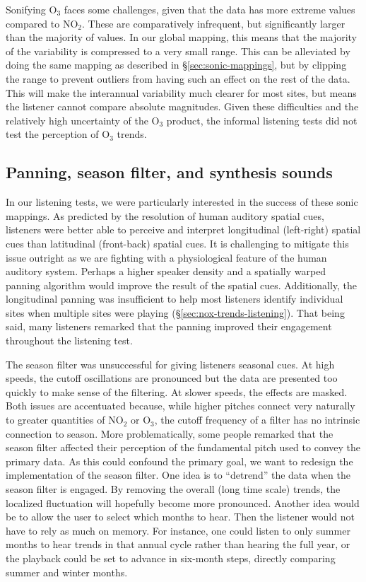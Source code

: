 \documentclass[a4paper,10pt,oneside]{article}
\newcommand{\ce}[1]{$\mathrm{#1}$}
\begin{document}
\begin{sloppy}
Sonifying \ce{O_3} faces some challenges, given that the data has more extreme values compared to \ce{NO_2}. These are comparatively infrequent, but significantly larger than the majority of values.  In our global mapping, this means that the majority of the variability is compressed to a very small range. This can be alleviated by doing the same mapping as described in \S\ref{sec:sonic-mappings}, but by clipping the range to prevent outliers from having such an effect on the rest of the data.  This will make the interannual variability much clearer for most sites, but means the listener cannot compare absolute magnitudes. Given these difficulties and the relatively high uncertainty of the \ce{O_3} product, the informal listening tests did not test the perception of \ce{O_3} trends.

\subsection{Panning, season filter, and synthesis sounds}
In our listening tests, we were particularly interested in the success of these sonic mappings. As predicted by the resolution of human auditory spatial cues, listeners were better able to perceive and interpret longitudinal (left-right) spatial cues than latitudinal (front-back) spatial cues. It is challenging to mitigate this issue outright as we are fighting with a physiological feature of the human auditory system. Perhaps a higher speaker density and a spatially warped panning algorithm would improve the result of the spatial cues. Additionally, the longitudinal panning was insufficient to help most listeners identify individual sites when multiple sites were playing (\S\ref{sec:nox-trends-listening}).  That being said, many listeners remarked that the panning improved their engagement throughout the listening test.  

The season filter was unsuccessful for giving listeners seasonal cues. At high speeds, the cutoff oscillations are pronounced but the data are presented too quickly to make sense of the filtering. At slower speeds, the effects are masked. Both issues are accentuated because, while higher pitches connect very naturally to greater quantities of \ce{NO_2} or \ce{O_3}, the cutoff frequency of a filter has no intrinsic connection to season.  More problematically, some people remarked that the season filter affected their perception of the fundamental pitch used to convey the primary data. As this could confound the primary goal, we want to redesign the implementation of the season filter. One idea is to ``detrend'' the data when the season filter is engaged. By removing the overall (long time scale) trends, the localized fluctuation will hopefully become more pronounced. Another idea would be to allow the user to select which months to hear. Then the listener would not have to rely as much on memory.  For instance, one could listen to only summer months to hear trends in that  annual cycle rather than hearing the full year, or the playback could be set to advance in six-month steps, directly comparing summer and winter months.   


\end{sloppy}
\end{document}
